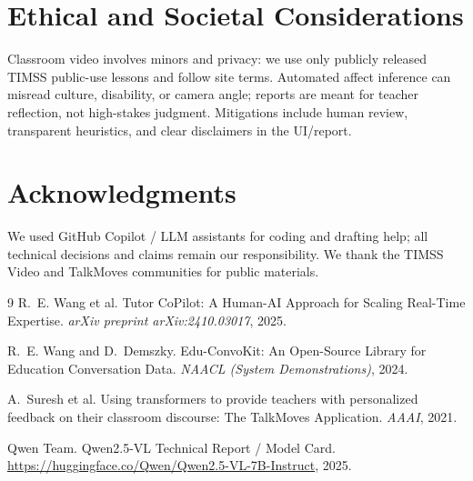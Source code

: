 \documentclass[11pt]{article}
\begin{document}
\section{Ethical and Societal Considerations}
Classroom video involves minors and privacy: we use only publicly released TIMSS public-use lessons and follow site terms. Automated affect inference can misread culture, disability, or camera angle; reports are meant for teacher reflection, not high-stakes judgment. Mitigations include human review, transparent heuristics, and clear disclaimers in the UI/report.

\section*{Acknowledgments}
We used GitHub Copilot / LLM assistants for coding and drafting help; all technical decisions and claims remain our responsibility. We thank the TIMSS Video and TalkMoves communities for public materials.

\begin{thebibliography}{9}
R.~E. Wang et al.
Tutor CoPilot: A Human-AI Approach for Scaling Real-Time Expertise.
\textit{arXiv preprint arXiv:2410.03017}, 2025.

R.~E. Wang and D.~Demszky.
Edu-ConvoKit: An Open-Source Library for Education Conversation Data.
\textit{NAACL (System Demonstrations)}, 2024.

A.~Suresh et al.
Using transformers to provide teachers with personalized feedback on their classroom discourse: The TalkMoves Application.
\textit{AAAI}, 2021.

Qwen Team.
Qwen2.5-VL Technical Report / Model Card.
\url{https://huggingface.co/Qwen/Qwen2.5-VL-7B-Instruct}, 2025.
\end{thebibliography}
\end{document}
